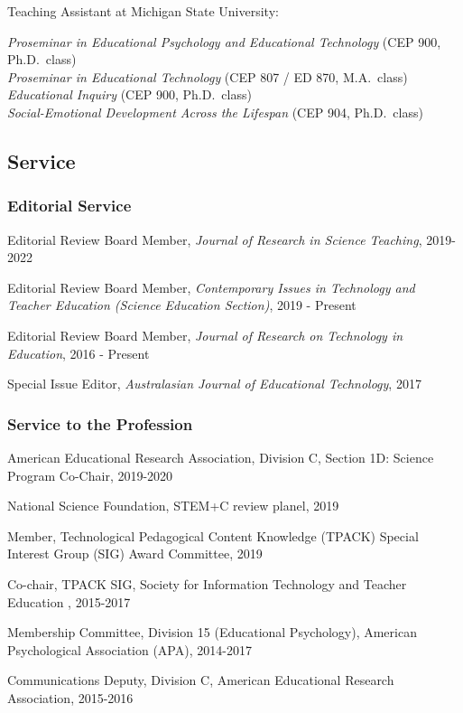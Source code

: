 \documentclass[14,]{article}
\begin{document}
Teaching Assistant at Michigan State University:

\emph{Proseminar in Educational Psychology and Educational Technology}
(CEP 900, Ph.D.~class)\\
\emph{Proseminar in Educational Technology} (CEP 807 / ED 870,
M.A.~class)\\
\emph{Educational Inquiry} (CEP 900, Ph.D.~class)\\
\emph{Social-Emotional Development Across the Lifespan} (CEP 904,
Ph.D.~class)

\subsection{Service}\label{service}

\subsubsection{Editorial Service}\label{editorial-service}

Editorial Review Board Member, \emph{Journal of Research in Science
Teaching}, 2019-2022

Editorial Review Board Member, \emph{Contemporary Issues in Technology
and Teacher Education (Science Education Section)}, 2019 - Present

Editorial Review Board Member, \emph{Journal of Research on Technology
in Education}, 2016 - Present

Special Issue Editor, \emph{Australasian Journal of Educational
Technology}, 2017

\subsubsection{Service to the
Profession}\label{service-to-the-profession}

American Educational Research Association, Division C, Section 1D:
Science Program Co-Chair, 2019-2020

National Science Foundation, STEM+C review planel, 2019

Member, Technological Pedagogical Content Knowledge (TPACK) Special
Interest Group (SIG) Award Committee, 2019

Co-chair, TPACK SIG, Society for Information Technology and Teacher
Education , 2015-2017

Membership Committee, Division 15 (Educational Psychology), American
Psychological Association (APA), 2014-2017

Communications Deputy, Division C, American Educational Research
Association, 2015-2016
\end{document}
